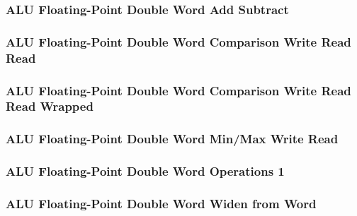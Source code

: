 \subsubsection[{\small ALU Floating-Point Double Word Add Subtract}]{ALU Floating-Point Double Word Add Subtract} \label{sec:format-ALU-FDADD}



\subsubsection[{\small ALU Floating-Point Double Word Comparison Write Read Read}]{ALU Floating-Point Double Word Comparison Write Read Read} \label{sec:format-ALU-FDCWRR}



\subsubsection[{\small ALU Floating-Point Double Word Comparison Write Read Read Wrapped}]{ALU Floating-Point Double Word Comparison Write Read Read Wrapped} \label{sec:format-ALU-FDCWRR.W}



\subsubsection[{\small ALU Floating-Point Double Word Min/Max Write Read}]{ALU Floating-Point Double Word Min/Max Write Read} \label{sec:format-ALU-FDMMWR}



\subsubsection[{\small ALU Floating-Point Double Word Operations 1}]{ALU Floating-Point Double Word Operations 1} \label{sec:format-ALU-FDMO1}



\subsubsection[{\small ALU Floating-Point Double Word Widen from Word}]{ALU Floating-Point Double Word Widen from Word} \label{sec:format-ALU-FDWIDEN}

